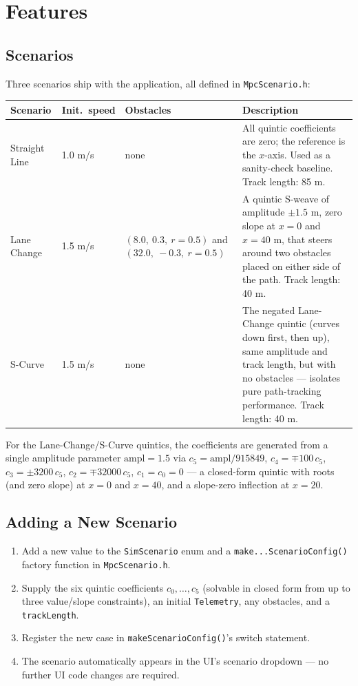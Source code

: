 ﻿\documentclass[11pt,a4paper]{article}
\begin{document}
\section{Features}

\subsection{Scenarios}
Three scenarios ship with the application, all defined in \texttt{MpcScenario.h}:

\begin{center}
\begin{tabular}{@{}lp{2.3cm}p{2.6cm}p{5.4cm}@{}}
\toprule
Scenario & Init.\ speed & Obstacles & Description \\
\midrule
Straight Line & 1.0 m/s & none & All quintic coefficients are zero; the reference is the $x$-axis. Used as a sanity-check baseline. Track length: 85 m. \\
Lane Change & 1.5 m/s & $(8.0,\ 0.3,\ r{=}0.5)$ and $(32.0,\ {-}0.3,\ r{=}0.5)$ & A quintic S-weave of amplitude $\pm1.5$ m, zero slope at $x=0$ and $x=40$ m, that steers around two obstacles placed on either side of the path. Track length: 40 m. \\
S-Curve & 1.5 m/s & none & The negated Lane-Change quintic (curves down first, then up), same amplitude and track length, but with no obstacles --- isolates pure path-tracking performance. Track length: 40 m. \\
\bottomrule
\end{tabular}
\end{center}

For the Lane-Change/S-Curve quintics, the coefficients are generated from a single amplitude parameter $\text{ampl}=1.5$ via $c_5 = \text{ampl}/915849$, $c_4 = \mp100\,c_5$, $c_3=\pm3200\,c_5$, $c_2=\mp32000\,c_5$, $c_1=c_0=0$ --- a closed-form quintic with roots (and zero slope) at $x=0$ and $x=40$, and a slope-zero inflection at $x=20$.

\subsection{Adding a New Scenario}
\begin{enumerate}
  \item Add a new value to the \texttt{SimScenario} enum and a \texttt{make...ScenarioConfig()} factory function in \texttt{MpcScenario.h}.
  \item Supply the six quintic coefficients $c_0,\dots,c_5$ (solvable in closed form from up to three value/slope constraints), an initial \texttt{Telemetry}, any obstacles, and a \texttt{trackLength}.
  \item Register the new case in \texttt{makeScenarioConfig()}'s switch statement.
  \item The scenario automatically appears in the UI's scenario dropdown --- no further UI code changes are required.
\end{enumerate}
\end{document}
